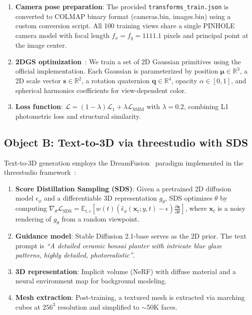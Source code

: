 \documentclass{article}
\begin{document}
\begin{enumerate}[leftmargin=*]
    \item \textbf{Camera pose preparation}: The provided \texttt{transforms\_train.json}
    is converted to COLMAP binary format (cameras.bin, images.bin) using a custom
    conversion script. All 100 training views share a single PINHOLE camera model
    with focal length $f_x = f_y = 1111.1$ pixels and principal point at the image
    center.
    \item \textbf{2DGS optimization}~\cite{huang20242dgs}: We train a set of
    2D Gaussian primitives using the official implementation. Each Gaussian is
    parameterized by position $\boldsymbol{\mu} \in \mathbb{R}^3$, a 2D scale
    vector $\mathbf{s} \in \mathbb{R}^2$, a rotation quaternion
    $\mathbf{q} \in \mathbb{R}^4$, opacity $\alpha \in [0,1]$, and spherical
    harmonics coefficients for view-dependent color.
    \item \textbf{Loss function}: $\mathcal{L} = (1-\lambda)\mathcal{L}_1 +
    \lambda\mathcal{L}_{\text{SSIM}}$ with $\lambda = 0.2$, combining L1
    photometric loss and structural similarity.
\end{enumerate}

\subsection{Object B: Text-to-3D via threestudio with SDS}
\label{sec:object_b}

Text-to-3D generation employs the DreamFusion~\cite{poole2022dreamfusion} paradigm
implemented in the threestudio framework~\cite{guo2023threestudio}:

\begin{enumerate}[leftmargin=*]
    \item \textbf{Score Distillation Sampling (SDS)}: Given a pretrained 2D
    diffusion model $\epsilon_\phi$ and a differentiable 3D representation
    $g_\theta$, SDS optimizes $\theta$ by computing
    $\nabla_\theta \mathcal{L}_{\text{SDS}} = \mathbb{E}_{t,\epsilon}
    \left[w(t)(\hat{\epsilon}_\phi(\mathbf{x}_t; y, t) - \epsilon)
    \frac{\partial \mathbf{x}}{\partial \theta}\right]$, where $\mathbf{x}_t$
    is a noisy rendering of $g_\theta$ from a random viewpoint.
    \item \textbf{Guidance model}: Stable Diffusion 2.1-base serves as the 2D
    prior. The text prompt is \textit{``A detailed ceramic bonsai planter with
    intricate blue glaze patterns, highly detailed, photorealistic''}.
    \item \textbf{3D representation}: Implicit volume (NeRF) with diffuse material
    and a neural environment map for background modeling.
    \item \textbf{Mesh extraction}: Post-training, a textured mesh is extracted
    via marching cubes at $256^3$ resolution and simplified to $\sim$50K faces.
\end{enumerate}
\end{document}
